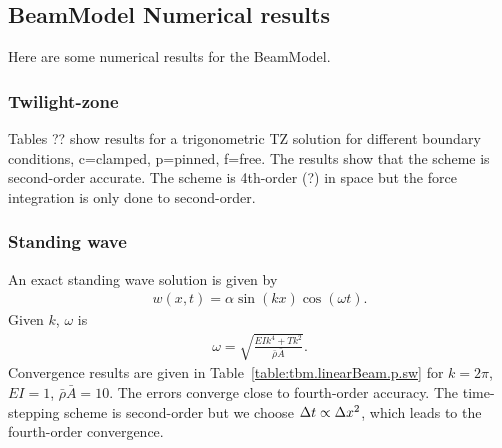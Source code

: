 \documentclass[11pt]{article}
\newcommand{\dt}{{\Delta t}}
\newcommand{\rhos}{\bar{\rho}}
\newcommand{\As}{\bar{A}}
\begin{document}
\clearpage
\subsection{BeamModel Numerical results} \label{eq:BeamModel_Results}


Here are some numerical results for the BeamModel.


\subsubsection{Twilight-zone} 

Tables ?? show results for a trigonometric TZ solution for different boundary conditions, c=clamped, p=pinned, f=free.
The results show that the scheme is second-order accurate. 
The scheme is 4th-order (?) in space but the force integration is only done to second-order.

{
 
 
 
}

\clearpage
\subsubsection{Standing wave} 

An exact standing wave solution is given by
\begin{align*}
   w(x,t) = \alpha \sin(k x)\cos(\omega t) .
\end{align*}
Given $k$, $\omega$ is 
\begin{align*}
   \omega =\sqrt{ \frac{E I k^4 + T k^2}{\rhos\As} } .
\end{align*}
Convergence results are given in Table~\ref{table:tbm.linearBeam.p.sw} for $k=2\pi$, $E I=1$, $\rhos\As=10$.
The errors converge close to fourth-order accuracy. The time-stepping scheme is second-order but 
we choose $\dt \propto \dx^2$, which leads to the fourth-order convergence.





%
%
\end{document}
